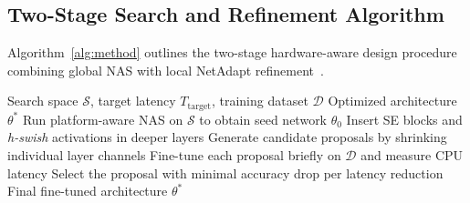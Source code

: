 \subsection{Two-Stage Search and Refinement Algorithm}
Algorithm~\ref{alg:method} outlines the two-stage hardware-aware design procedure combining global NAS with local NetAdapt refinement~\cite{howard2019mobilenetv3}.
\begin{algorithm}[t]
\caption{Hardware-Aware Search and NetAdapt Refinement}
\label{alg:method}
\begin{algorithmic}[1]
\Require Search space $\mathcal{S}$, target latency $T_{\mathrm{target}}$, training dataset $\mathcal{D}$
\Ensure Optimized architecture $\theta^{*}$
\State Run platform-aware NAS on $\mathcal{S}$ to obtain seed network $\theta_{0}$
\State Insert SE blocks and \textit{h-swish} activations in deeper layers
\State Generate candidate proposals by shrinking individual layer channels
\State Fine-tune each proposal briefly on $\mathcal{D}$ and measure CPU latency
\State Select the proposal with minimal accuracy drop per latency reduction
\EndWhile
\State \Return Final fine-tuned architecture $\theta^{*}$
\end{algorithmic}
\end{algorithm}
